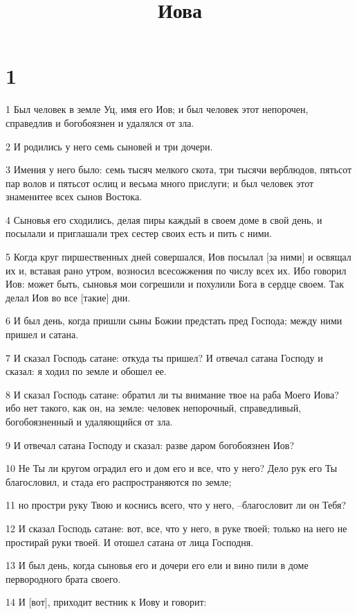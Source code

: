 

\title{Иова}


\chapter{1}

\par 1 Был человек в земле Уц, имя его Иов; и был человек этот непорочен, справедлив и богобоязнен и удалялся от зла.
\par 2 И родились у него семь сыновей и три дочери.
\par 3 Имения у него было: семь тысяч мелкого скота, три тысячи верблюдов, пятьсот пар волов и пятьсот ослиц и весьма много прислуги; и был человек этот знаменитее всех сынов Востока.
\par 4 Сыновья его сходились, делая пиры каждый в своем доме в свой день, и посылали и приглашали трех сестер своих есть и пить с ними.
\par 5 Когда круг пиршественных дней совершался, Иов посылал [за ними] и освящал их и, вставая рано утром, возносил всесожжения по числу всех их. Ибо говорил Иов: может быть, сыновья мои согрешили и похулили Бога в сердце своем. Так делал Иов во все [такие] дни.
\par 6 И был день, когда пришли сыны Божии предстать пред Господа; между ними пришел и сатана.
\par 7 И сказал Господь сатане: откуда ты пришел? И отвечал сатана Господу и сказал: я ходил по земле и обошел ее.
\par 8 И сказал Господь сатане: обратил ли ты внимание твое на раба Моего Иова? ибо нет такого, как он, на земле: человек непорочный, справедливый, богобоязненный и удаляющийся от зла.
\par 9 И отвечал сатана Господу и сказал: разве даром богобоязнен Иов?
\par 10 Не Ты ли кругом оградил его и дом его и все, что у него? Дело рук его Ты благословил, и стада его распространяются по земле;
\par 11 но простри руку Твою и коснись всего, что у него, --благословит ли он Тебя?
\par 12 И сказал Господь сатане: вот, все, что у него, в руке твоей; только на него не простирай руки твоей. И отошел сатана от лица Господня.
\par 13 И был день, когда сыновья его и дочери его ели и вино пили в доме первородного брата своего.
\par 14 И [вот], приходит вестник к Иову и говорит:
